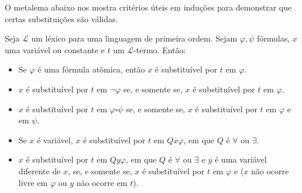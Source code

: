 O metalema abaixo nos mostra critérios úteis em induções para demonstrar que certas substituições são válidas.

\begin{metalemma}\label{mlem:criteriosSubstituibilidade}
    Seja $\mathcal L$ um léxico para uma linguagem de primeira ordem.
    Sejam $\varphi, \psi$ fórmulas, $x$ uma variável ou constante e $t$ um $\mathcal L$-termo.
    Então:
    \begin{itemize}
        \item Se $\varphi$ é uma fórmula atômica, então $x$ é substituível por $t$ em $\varphi$.
        \item $x$ é substituível por $t$ em $\neg \varphi$ se, e somente se, $x$ é substituível por $t$ em $\varphi$.
        \item $x$ é substituível por $t$ em $\varphi \square \psi$ se, e somente se, $x$ é substituível por $t$ em $\varphi$ e em $\psi$.
        \item Se $x$ é variável, $x$ é substituível por $t$ em $Q x \varphi$, em que $Q$ é $\forall$ ou $\exists$.
        \item $x$ é substituível por $t$ em $Q y \varphi$, em que $Q$ é $\forall$ ou $\exists$ e $y$ é uma variável diferente de $x$, se, e somente se, $x$ é substituível por $t$ em $\varphi$ e ($x$ não ocorre livre em $\varphi$ ou $y$ não ocorre em $t$).
    \end{itemize}
\end{metalemma}
